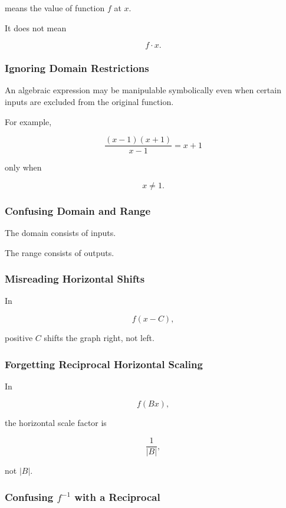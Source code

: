 means the value of function \(f\) at \(x\).

It does not mean

\[ f\cdot x. \]

\subsubsection{Ignoring Domain Restrictions}

An algebraic expression may be manipulable symbolically even when certain
inputs are excluded from the original function.

For example,

\[ \frac{(x-1)(x+1)}{x-1}=x+1 \]

only when

\[ x\neq1. \]

\subsubsection{Confusing Domain and Range}

The domain consists of inputs.

The range consists of outputs.

\subsubsection{Misreading Horizontal Shifts}

In

\[ f(x-C), \]

positive \(C\) shifts the graph right, not left.

\subsubsection{Forgetting Reciprocal Horizontal Scaling}

In

\[ f(Bx), \]

the horizontal scale factor is

\[ \frac1{|B|}, \]

not \(|B|\).

\subsubsection{Confusing \(f^{-1}\) with a Reciprocal}

